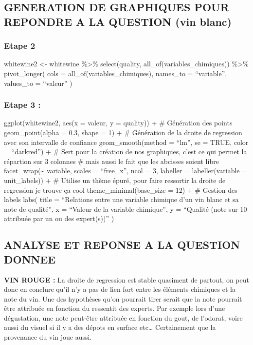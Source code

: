 \documentclass[
]{article}
\begin{document}
\subsection{\texorpdfstring{\textbf{GENERATION DE GRAPHIQUES POUR
REPONDRE A LA QUESTION (vin
blanc)}}{GENERATION DE GRAPHIQUES POUR REPONDRE A LA QUESTION (vin blanc)}}\label{generation-de-graphiques-pour-repondre-a-la-question-vin-blanc}

\subsubsection{Etape 2}\label{etape-2}

whitewine2 \textless- whitewine \%\textgreater\% select(quality,
all\_of(variables\_chimiques)) \%\textgreater\% pivot\_longer( cols =
all\_of(variables\_chimiques), names\_to = ``variable'', values\_to =
``valeur'' )

\subsubsection{Etape 3 :}\label{etape-3}

ggplot(whitewine2, aes(x = valeur, y = quality)) + \# Génération des
points geom\_point(alpha = 0.3, shape = 1) + \# Génération de la droite
de regression avec son intervalle de confiance geom\_smooth(method =
``lm'', se = TRUE, color = ``darkred'') + \# Sert pour la création de
nos graphiques, c'est ce qui permet la répartion sur 3 colonnes \# mais
aussi le fait que les abcisses soient libre
facet\_wrap(\textasciitilde{} variable, scales = ``free\_x'', ncol = 3,
labeller = labeller(variable = unit\_labels)) + \# Utilise un thème
épuré, pour faire ressortir la droite de regression je trouve ça cool
theme\_minimal(base\_size = 12) + \# Gestion des labels labs( title =
``Relations entre une variable chimique d'un vin blanc et sa note de
qualité'', x = ``Valeur de la variable chimique'', y = ``Qualité (note
sur 10 attribuée par un ou des expert(s))'' )

\subsection{\texorpdfstring{\textbf{ANALYSE ET REPONSE A LA QUESTION
DONNEE}}{ANALYSE ET REPONSE A LA QUESTION DONNEE}}\label{analyse-et-reponse-a-la-question-donnee}

\textbf{VIN ROUGE :} La droite de regression est stable quasiment de
partout, on peut donc en conclure qu'il n'y a pas de lien fort entre les
éléments chimiques et la note du vin. Une des hypothèses qu'on pourrait
tirer serait que la note pourrait être attribuée en fonction du
ressentit des experts. Par exemple lors d'une dégustation, une note
peut-être attribuée en fonction du gout, de l'odorat, voire aussi du
visuel si il y a des dépots en surface etc\ldots{} Certainement que la
provenance du vin joue aussi.
\end{document}
